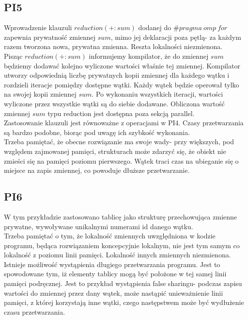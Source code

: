 \documentclass{article}
\begin{document}
\subsection{PI5}Wprowadzenie klauzuli $reduction(+:sum)$ dodanej do $\#pragma\:omp\:for$ zapewnia prywatność zmiennej $sum$, mimo jej deklaracji poza pętlą- za każdym razem tworzona nowa, prywatna zmienna. Reszta lokalności niezmienona. \\
Pisząc $reduction(+:sum)$ informujemy kompilator, że do zmiennej $sum$ będziemy dodawać kolejno wyliczone wartości właśnie tej zmiennej. Kompilator utworzy odpowiednią liczbę prywatnych kopii zmiennej dla każdego wątku i rozdzieli iteracje pomiędzy dostępne wątki. Każdy wątek będzie operował tylko na swojej kopii zmiennej $sum$. Po wykonaniu wszystkich iteracji, wartości wyliczone przez wszystkie wątki są do siebie dodawane. Obliczona wartość zmiennej $sum$ typu reduction jest dostępna poza sekcją parallel.\\
Zastosowanie klauzuli jest równoważne z operacjami w PI4. Czasy przetwarzania są bardzo podobne, biorąc pod uwagę ich szybkość wykonania.\\
Trzeba pamiętać, że obecne rozwiązanie ma swoje wady- przy większych, pod względem zajmowanej pamięci, strukturach może zdarzyć się, że obiekt nie zmieści się na pamięci poziomu pierwszego. Wątek traci czas na ubieganie się o miejsce na zapis zmiennej, co powoduje dłuższe przetwarzanie.
\subsection{PI6}
W tym przykładzie zastosowano tablicę jako strukturę przechowująca zmienne prywatne, wywoływane unikalnymi numerami id danego wątku. \\
Trzeba pamiętać o tym, że lokalność zmiennych uwzględniona w kodzie programu, będąca rozwiązaniem koncepcyjnie lokalnym, nie jest tym samym co lokalność z poziomu linii pamięci. Lokalność innych zmiennych niezmienona.\\
Istnieje możliwość wystąpienia długiego przetwarzania programu. Jest to spowodowane tym, iż elementy tablicy mogą być położone w tej samej linii pamięci podręcznej. Jest to przykład wystąpienia false sharingu- podczas zapisu wartości do zmiennej przez dany wątek, może nastąpić unieważnienie linii pamięci, z której korzystają inne wątki, czego następstwem może być wydłużenie czasu przetwarzania.
\end{document}
